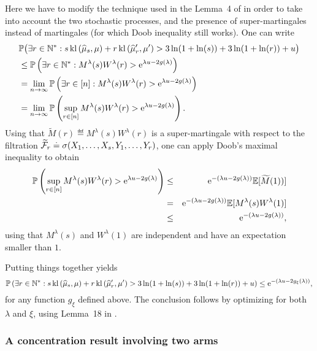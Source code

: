 Here we have to modify the technique used in the Lemma~4 of \cite{KK18Martingales} in order to take into account the two stochastic processes, and the presence of super-martingales instead of martingales (for which Doob inequality still works).
One can write
%
\begin{align*}
    &\mathbb{P}\bigl( \exists r \in \mathbb{N}^* : s \, \mathrm{kl}\left(\widehat{\mu}_{s},\mu\right) + r \, \mathrm{kl}\left(\widehat{\mu}_r',\mu'\right) > 3\ln(1+\ln(s)) + 3\ln(1+\ln(r)) + u \bigr) \\
    & \leq \mathbb{P}\left(\exists r \in \mathbb{N}^* : M^\lambda(s)W^\lambda(r) > \mathrm{e}^{\lambda u - 2g(\lambda)}\right) \\
    & = \lim_{n \rightarrow \infty} \mathbb{P}\left(\exists r \in [n] :  M^\lambda(s)W^\lambda(r) > \mathrm{e}^{\lambda u - 2g(\lambda)}\right) \\
    & = \lim_{n \rightarrow \infty} \mathbb{P}\left(\sup_{r \in [n]}  M^\lambda(s)W^\lambda(r) > \mathrm{e}^{\lambda u - 2g(\lambda)}\right).
\end{align*}
%
Using that $\widetilde{M}(r) \eqdef M^\lambda(s)W^\lambda(r)$ is a super-martingale with respect to the filtration $\widetilde{\mathcal{F}}_r \overset{.}{=} \sigma(X_1,\dots,X_s, Y_1,\dots,Y_r)$, one can apply Doob's maximal inequality to obtain
\begin{eqnarray*}
    \mathbb{P}\left(\sup_{r \in [n]}  M^\lambda(s)W^\lambda(r) > \mathrm{e}^{\lambda u - 2g(\lambda)}\right) &\leq& \mathrm{e}^{-(\lambda u - 2g(\lambda))}\mathbb{E}[\widetilde{M}(1))] \\
    & = & \mathrm{e}^{-(\lambda u - 2g(\lambda))}\mathbb{E}[M^\lambda(s)W^\lambda(1)] \\
    & \leq & \mathrm{e}^{-(\lambda u - 2g(\lambda))},
\end{eqnarray*}
using that $M^\lambda(s)$ and $W^\lambda(1)$ are independent and have an expectation smaller than $1$.

Putting things together yields
\[\mathbb{P}\left(\exists r \in \mathbb{N}^* : s \, \mathrm{kl}\left(\widehat{\mu}_{s},\mu\right) + r \, \mathrm{kl}\left(\widehat{\mu}_r',\mu'\right) > 3\ln(1+\ln(s)) + 3\ln(1+\ln(r)) + u\right) \leq \mathrm{e}^{-\left(\lambda u - 2g_{\xi}(\lambda)\right)},\]
for any function $g_{\xi}$ defined above.
%
The conclusion follows by optimizing for both $\lambda$ and $\xi$, using Lemma~18 in \cite{KK18Martingales}.


\subsubsection{A concentration result involving two arms}\label{proof:6:Chernoff2arms}


